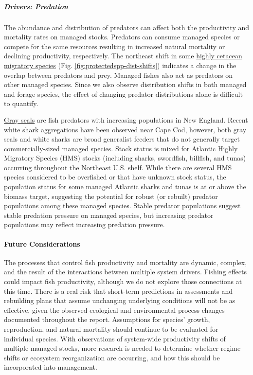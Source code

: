 \documentclass[
  10pt,
]{article}
\begin{document}
\subparagraph{Drivers: Predation}\label{drivers-predation-1}

The abundance and distribution of predators can affect both the productivity and mortality rates on managed stocks. Predators can consume managed species or compete for the same resources resulting in increased natural mortality or declining productivity, respectively. The northeast shift in some \href{https://noaa-edab.github.io/catalog/cetacean_dist.html}{highly cetacean migratory species} (Fig. \ref{fig:protectedspp-dist-shifts}) indicates a change in the overlap between predators and prey. Managed fishes also act as predators on other managed species. Since we also observe distribution shifts in both managed and forage species, the effect of changing predator distributions alone is difficult to quantify.

\href{https://noaa-edab.github.io/catalog/grayseal.html}{Gray seals} are fish predators with increasing populations in New England. Recent white shark aggregations have been observed near Cape Cod, however, both gray seals and white sharks are broad generalist feeders that do not generally target commercially-sized managed species. \href{https://noaa-edab.github.io/catalog/hms_stock_status.html}{Stock status} is mixed for Atlantic Highly Migratory Species (HMS) stocks (including sharks, swordfish, billfish, and tunas) occurring throughout the Northeast U.S. shelf. While there are several HMS species considered to be overfished or that have unknown stock status, the population status for some managed Atlantic sharks and tunas is at or above the biomass target, suggesting the potential for robust (or rebuilt) predator populations among these managed species. Stable predator populations suggest stable predation pressure on managed species, but increasing predator populations may reflect increasing predation pressure.

\paragraph{Future Considerations}\label{future-considerations-2}

The processes that control fish productivity and mortality are dynamic, complex, and the result of the interactions between multiple system drivers. Fishing effects could impact fish productivity, although we do not explore those connections at this time. There is a real risk that short-term predictions in assessments and rebuilding plans that assume unchanging underlying conditions will not be as effective, given the observed ecological and environmental process changes documented throughout the report. Assumptions for species' growth, reproduction, and natural mortality should continue to be evaluated for individual species. With observations of system-wide productivity shifts of multiple managed stocks, more research is needed to determine whether regime shifts or ecosystem reorganization are occurring, and how this should be incorporated into management.
\end{document}
